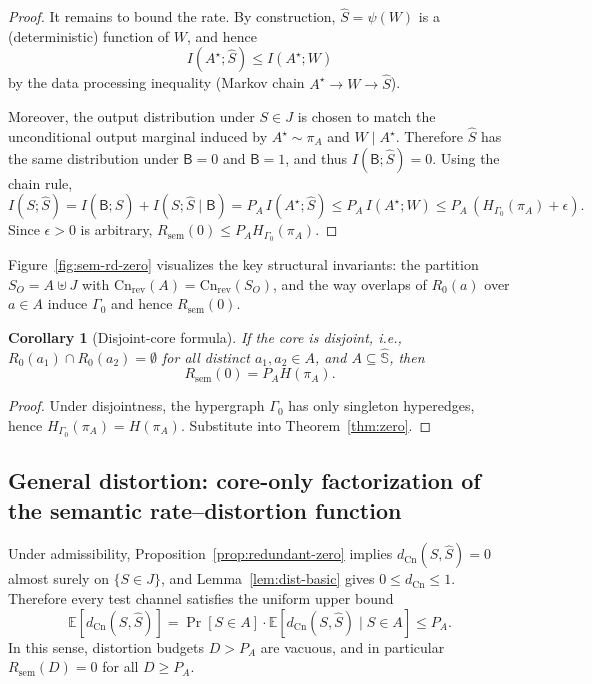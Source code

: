 \documentclass[twoside]{article}
\newtheorem{corollary}[theorem]{Corollary}
\newcommand{\Cn}{\mathrm{Cn}}
\newcommand{\sem}{\mathrm{sem}}
\newcommand{\E}{\mathbb{E}}
\newcommand{\1}{\mathbf{1}}
\begin{document}
\begin{proof}
It remains to bound the rate. By construction, \(\hat{S}=\psi(W)\) is a (deterministic) function of \(W\), and hence
\[
I(A^\star;\hat{S}) \le I(A^\star;W)
\]
by the data processing inequality (Markov chain \(A^\star \to W \to \hat{S}\)).

Moreover, the output distribution under \(S\in J\) is chosen to match the unconditional output marginal induced by
\(A^\star\sim\pi_A\) and \(W\mid A^\star\). Therefore \(\hat{S}\) has the same distribution under \(\mathsf{B}=0\) and \(\mathsf{B}=1\),
and thus \(I(\mathsf{B};\hat{S})=0\). Using the chain rule,
\[
I(S;\hat{S}) = I(\mathsf{B};\hat{S}) + I(S;\hat{S}\mid \mathsf{B})
= P_A\, I(A^\star;\hat{S})
\le P_A\, I(A^\star;W)
\le P_A\,(H_{\Gamma_0}(\pi_A)+\epsilon).
\]
Since \(\epsilon>0\) is arbitrary, \(R_{\sem}(0)\le P_A H_{\Gamma_0}(\pi_A)\).
\end{proof}

Figure~\ref{fig:sem-rd-zero} visualizes the key structural invariants: the partition \(S_O=A\uplus J\) with
\(\Cn_{\mathrm{rev}}(A)=\Cn_{\mathrm{rev}}(S_O)\), and the way overlaps of \(R_0(a)\) over \(a\in A\) induce \(\Gamma_0\) and hence \(R_{\sem}(0)\).

\begin{corollary}[Disjoint-core formula]
\label{cor:disjoint}
If the core is \emph{disjoint}, i.e., \(R_0(a_1)\cap R_0(a_2)=\emptyset\) for all distinct \(a_1,a_2\in A\), and \(A\subseteq \hat{\mathbb{S}}\),
then
\[
R_{\sem}(0)=P_A H(\pi_A).
\]
\end{corollary}

\begin{proof}
Under disjointness, the hypergraph \(\Gamma_0\) has only singleton hyperedges, hence \(H_{\Gamma_0}(\pi_A)=H(\pi_A)\).
Substitute into Theorem~\ref{thm:zero}.
\end{proof}

\subsection{General distortion: core-only factorization of the semantic rate--distortion function}
\label{sec:sem-general}

Under admissibility, Proposition~\ref{prop:redundant-zero} implies \(d_{\Cn}(S,\hat S)=0\) almost surely on \(\{S\in J\}\),
and Lemma~\ref{lem:dist-basic} gives \(0\le d_{\Cn}\le 1\). Therefore every test channel satisfies the uniform upper bound
\[
\E[d_{\Cn}(S,\hat S)]
=\Pr[S\in A]\cdot \E[d_{\Cn}(S,\hat S)\mid S\in A]
\le P_A.
\]
In this sense, distortion budgets \(D>P_A\) are vacuous, and in particular \(R_{\sem}(D)=0\) for all \(D\ge P_A\).
\end{document}
